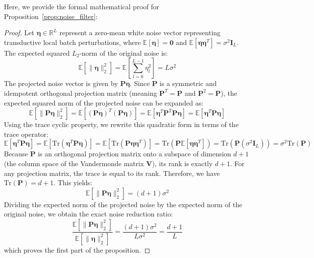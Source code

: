 Here, we provide the formal mathematical proof for Proposition~\ref{prop:noise_filter}:
\begin{proof}
Let $\boldsymbol{\eta} \in \mathbb{R}^L$ represent a zero-mean white noise vector representing transductive local batch perturbations, where $\mathbb{E}[\boldsymbol{\eta}] = \mathbf{0}$ and $\mathbb{E}[\boldsymbol{\eta}\boldsymbol{\eta}^T] = \sigma^2 \mathbf{I}_L$. The expected squared $L_2$-norm of the original noise is:
\begin{equation}
\mathbb{E}\left[ \|\boldsymbol{\eta}\|_2^2 \right] = \mathbb{E}\left[ \sum_{l=0}^{L-1} \eta_l^2 \right] = L\sigma^2
\end{equation}
The projected noise vector is given by $\mathbf{P}\boldsymbol{\eta}$. Since $\mathbf{P}$ is a symmetric and idempotent orthogonal projection matrix (meaning $\mathbf{P}^T = \mathbf{P}$ and $\mathbf{P}^2 = \mathbf{P}$), the expected squared norm of the projected noise can be expanded as:
\begin{equation}
\mathbb{E}\left[ \|\mathbf{P}\boldsymbol{\eta}\|_2^2 \right] = \mathbb{E}\left[ (\mathbf{P}\boldsymbol{\eta})^T(\mathbf{P}\boldsymbol{\eta}) \right] = \mathbb{E}\left[ \boldsymbol{\eta}^T \mathbf{P}^T \mathbf{P} \boldsymbol{\eta} \right] = \mathbb{E}\left[ \boldsymbol{\eta}^T \mathbf{P} \boldsymbol{\eta} \right]
\end{equation}
Using the trace cyclic property, we rewrite this quadratic form in terms of the trace operator:
\begin{equation}
\mathbb{E}\left[ \boldsymbol{\eta}^T \mathbf{P} \boldsymbol{\eta} \right] = \mathbb{E}\left[ \text{Tr}(\boldsymbol{\eta}^T \mathbf{P} \boldsymbol{\eta}) \right] = \mathbb{E}\left[ \text{Tr}(\mathbf{P} \boldsymbol{\eta}\boldsymbol{\eta}^T) \right] = \text{Tr}\left(\mathbf{P} \mathbb{E}[\boldsymbol{\eta}\boldsymbol{\eta}^T]\right) = \text{Tr}\left(\mathbf{P} (\sigma^2 \mathbf{I}_L)\right) = \sigma^2 \text{Tr}(\mathbf{P})
\end{equation}
Because $\mathbf{P}$ is an orthogonal projection matrix onto a subspace of dimension $d+1$ (the column space of the Vandermonde matrix $\mathbf{V}$), its rank is exactly $d+1$. For any projection matrix, the trace is equal to its rank. Therefore, we have $\text{Tr}(\mathbf{P}) = d+1$. This yields:
\begin{equation}
\mathbb{E}\left[ \|\mathbf{P}\boldsymbol{\eta}\|_2^2 \right] = (d+1) \sigma^2
\end{equation}
Dividing the expected norm of the projected noise by the expected norm of the original noise, we obtain the exact noise reduction ratio:
\begin{equation}
\frac{\mathbb{E}\left[ \|\mathbf{P}\boldsymbol{\eta}\|_2^2 \right]}{\mathbb{E}\left[ \|\boldsymbol{\eta}\|_2^2 \right]} = \frac{(d+1)\sigma^2}{L\sigma^2} = \frac{d+1}{L}
\end{equation}
which proves the first part of the proposition.


\end{proof}
